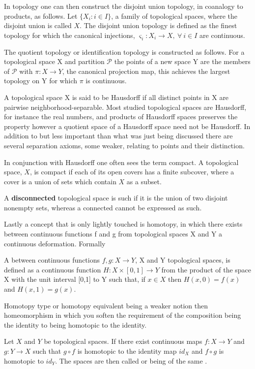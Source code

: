 \documentclass[../../main.tex]{subfiles}
\begin{document}
    In topology one can then construct the disjoint union topology, in coanalogy to products, as follows. Let $\{X_i : i \in I\}$, a family of topological spaces, where the disjoint union is called $X$. The disjoint union topology is defined as the finest topology for which the canonical injections, $\varsigma_i :X_i\to X, \: \forall\: i \in I$ are continuous.
    
    The quotient topology or identification topology is constructed as follows. For a topological space X and partition $\mathcal{P}$ the points of a new space Y are the members of $\mathcal{P}$ with $\pi:X\to Y$, the canonical projection map, this achieves the largest topology on Y for which $\pi$ is continuous.
    
    A topological space X is said to be Hausdorff if all distinct points in X are pairwise neighborhood-separable. Most studied topological spaces are Hausdorff, for instance the real numbers, and products of Hausdorff spaces preserves the property however a quotient space of a Hausdorff space need not be Hausdorff. In addition to but less important than what was just being discussed there are several separation axioms, some weaker, relating to points and their distinction. 
    
    In conjunction with Hausdorff one often sees the term compact. A topological space, $X$, is compact if each of its open covers has a finite subcover, where a cover is a union of sets which contain $X$ as a subset. 
    
    A \textbf{disconnected} topological space is such if it is the union of two disjoint nonempty sets, whereas a connected cannot be expressed as such. 

    Lastly a concept that is only lightly touched is homotopy, in which there exists between continuous functions f and g from topological spaces X and Y a continuous deformation. Formally

    \begin{definition}
        A  between continuous functions $f,g: X\to Y$, X and Y topological spaces, is defined as a continuous function  $H : X \times [0,1] \to Y$ from the product of the space X with the unit interval [0,1] to Y such that, if $x \in X$ then $H(x,0) = f(x)$ and $H(x,1) = g(x)$.
    \end{definition}

    Homotopy type or homotopy equivalent being a weaker notion then homeomorphism in which you soften the requirement of the composition being the identity to being homotopic to the identity. 

    \begin{definition}
        Let $X$ and $Y$ be topological spaces. If there exist continuous maps $f : X \to Y$ and $g : Y \to X$ such that $g \circ f$ is homotopic to the identity map $id_X$ and $f \circ g$ is homotopic to $id_Y$. The spaces are then called  or being of the same .
    \end{definition}
\end{document}
